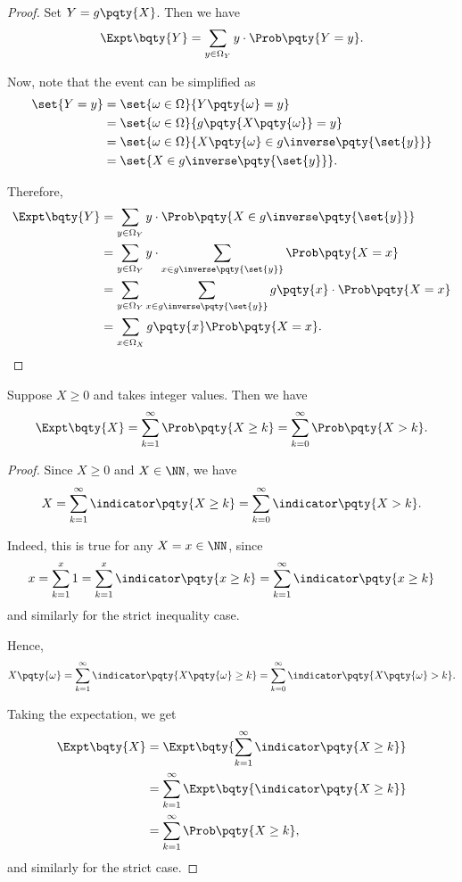 \begin{proof}
    Set \(Y = g\pqty{X}\). Then we have
    \[
        \Expt\bqty{Y} = \sum_{y \in \Omega_Y} y \cdot \Prob\pqty{Y = y}.
    \]

    Now, note that the event can be simplified as
    \begin{align*}
        \set{Y = y} &= \set{\omega \in \Omega}{Y \pqty{\omega} = y} \\
        &= \set{\omega \in \Omega}{g\pqty{X\pqty{\omega}} = y} \\
        &= \set{\omega \in \Omega}{X\pqty{\omega} \in g\inverse \pqty{\set{y}}} \\
        &= \set{X \in g\inverse \pqty{\set{y}}}.
    \end{align*}

    Therefore,
    \begin{align*}
        \Expt\bqty{Y} &= \sum_{y \in \Omega_Y} y \cdot \Prob\pqty{X \in g\inverse\pqty{\set{y}}} \\
        &= \sum_{y \in \Omega_Y} y \cdot \sum_{x \in g\inverse\pqty{\set{y}}} \Prob\pqty{X = x} \\
        &= \sum_{y \in \Omega_Y} \sum_{x \in g\inverse\pqty{\set{y}}} g\pqty{x} \cdot \Prob\pqty{X = x} \\
        &= \sum_{x \in \Omega_X} g\pqty{x} \Prob\pqty{X = x}.
    \end{align*}
\end{proof}

\begin{proposition}
    \label{prop:expt-natural-number-random-variable}%
    Suppose \(X \geq 0\) and takes integer values. Then we have
    \[
        \Expt\bqty{X} = \sum_{k = 1}^{\infty} \Prob\pqty{X \geq k} = \sum_{k = 0}^{\infty} \Prob\pqty{X > k}.
    \]
\end{proposition}

\begin{proof}
    Since \(X \geq 0\) and \(X \in \NN\), we have
    \[
        X = \sum_{k = 1}^{\infty} \indicator \pqty{X \geq k} = \sum_{k = 0}^{\infty} \indicator \pqty{X > k}.
    \]

    Indeed, this is true for any \(X = x \in \NN\), since
    \[
        x = \sum_{k = 1}^{x} 1 = \sum_{k = 1}^{x} \indicator \pqty{x \geq k} = \sum_{k = 1}^{\infty} \indicator \pqty{x \geq k}
    \]
    and similarly for the strict inequality case.

    Hence,
    \[
        X \pqty{\omega} = \sum_{k = 1}^{\infty} \indicator \pqty{X \pqty{\omega} \geq k} = \sum_{k = 0}^{\infty} \indicator \pqty{X \pqty{\omega} > k}.
    \]

    Taking the expectation, we get
    \begin{align*}
        \Expt\bqty{X} &= \Expt\bqty{\sum_{k = 1}^{\infty} \indicator\pqty{X \geq k}} \\
        &= \sum_{k = 1}^{\infty} \Expt\bqty{\indicator\pqty{X \geq k}} \\
        &= \sum_{k = 1}^{\infty} \Prob\pqty{X \geq k},
    \end{align*}
    and similarly for the strict case.
\end{proof}

